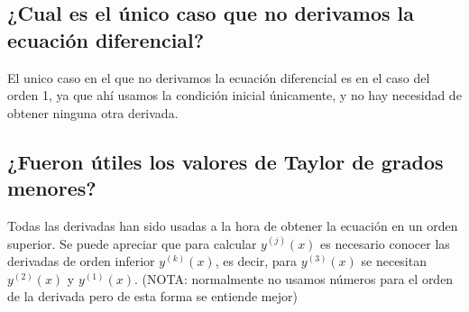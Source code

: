 \documentclass{article}
\begin{document}

\subsection{¿Cual es el único caso que no derivamos la ecuación diferencial?}

El unico caso en el que no derivamos la ecuación diferencial es en el caso del orden 1, ya que ahí usamos la condición inicial únicamente, y no hay necesidad de obtener ninguna otra derivada.

\subsection{¿Fueron útiles los valores de Taylor de grados menores?}

Todas las derivadas han sido usadas a la hora de obtener la ecuación en un orden superior. Se puede apreciar que para calcular $y^{(j)}(x)$ es necesario conocer las derivadas de orden inferior $y^{(k)}(x)$, es decir, para $y^{(3)}(x)$ se necesitan $y^{(2)}(x)$ y $y^{(1)}(x)$. (NOTA: normalmente no usamos números para el orden de la derivada pero de esta forma se entiende mejor)
\end{document}
